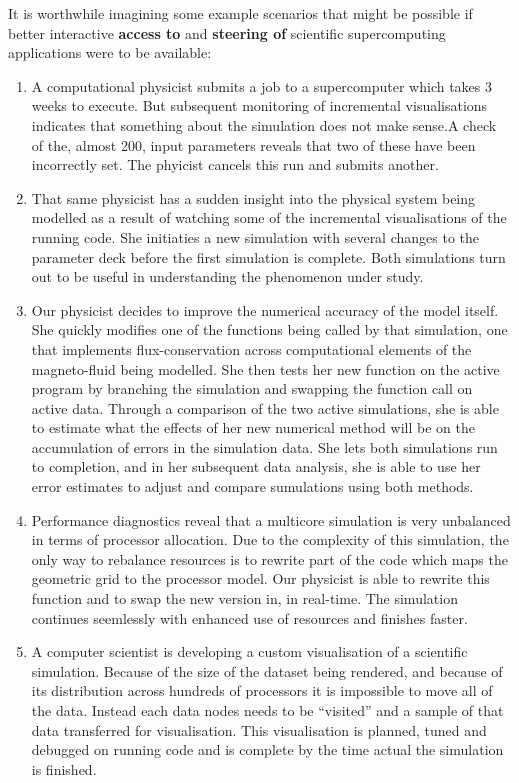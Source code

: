 \documentclass[a4paper,fontsize=12pt]{scrartcl}
\begin{document}
It is worthwhile imagining some example scenarios that might be
possible if better interactive \textbf{access to} and \textbf{steering
  of} scientific supercomputing applications were to be available:
\begin{enumerate}
\item A computational physicist submits a job to a supercomputer which
  takes 3 weeks to execute. But subsequent monitoring of incremental
  visualisations indicates that something about the simulation does
  not make sense.A check of the, almost 200, input parameters reveals
  that two of these have been incorrectly set. The phyicist cancels
  this run and submits another.

\item That same physicist has a sudden insight into the physical
  system being modelled as a result of watching some of the
  incremental visualisations of the running code. She initiaties a new
  simulation with several changes to the parameter deck before the
  first simulation is complete. Both simulations turn out to be useful
  in understanding the phenomenon under study.

\item Our physicist decides to improve the numerical accuracy of the
  model itself. She quickly modifies one of the functions being called
  by that simulation, one that implements flux-conservation across
  computational elements of the magneto-fluid being modelled. She then
  tests her new function on the active program by branching the
  simulation and swapping the function call on active data. Through a
  comparison of the two active simulations, she is able to estimate
  what the effects of her new numerical method will be on the
  accumulation of errors in the simulation data. She lets both
  simulations run to completion, and in her subsequent data analysis,
  she is able to use her error estimates to adjust and compare
  sumulations using both methods.

\item Performance diagnostics reveal that a multicore simulation is
  very unbalanced in terms of processor allocation. Due to the
  complexity of this simulation, the only way to rebalance resources
  is to rewrite part of the code which maps the geometric grid to the
  processor model. Our physicist is able to rewrite this function and
  to swap the new version in, in real-time. The simulation continues
  seemlessly with enhanced use of resources and finishes faster.

\item A computer scientist is developing a custom visualisation of a
  scientific simulation. Because of the size of the dataset being
  rendered, and because of its distribution across hundreds of
  processors it is impossible to move all of the data. Instead each
  data nodes needs to be ``visited'' and a sample of that data
  transferred for visualisation. This visualisation is planned, tuned
  and debugged on running code and is complete by the time actual the
  simulation is finished.


\end{enumerate}
\end{document}
